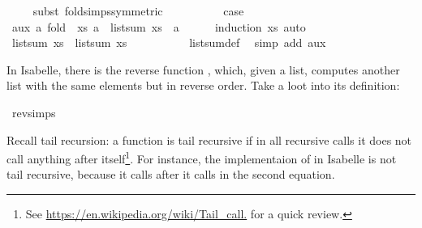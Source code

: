 \begin{isabellebody}
\ \ \ \ \isamarkupfalse%
{\isacharparenleft}{\kern0pt}subst\ fold{\isachardot}{\kern0pt}simps{\isacharparenleft}{\kern0pt}{}{\isacharparenright}{\kern0pt}{\isacharbrackleft}{\kern0pt}symmetric{\isacharbrackright}{\kern0pt}{\isacharparenright}{\kern0pt}\isanewline
\ \ \ \ \isacommand{{\isachardot}{\kern0pt}{\isachardot}{\kern0pt}}\isamarkupfalse%
\isanewline
\isanewline
\ \ \isamarkupfalse%
\ \isamarkupfalse%
\ {\isacharquery}{\kern0pt}case\isanewline
\ \ \ \ \isacommand{{\isachardot}{\kern0pt}}\isamarkupfalse%
\isanewline
{}\isamarkupfalse%
%
\endisatagproof
{\isafoldproof}%
%
\isadelimproof
\isanewline
%
\endisadelimproof
\isanewline
{}\isamarkupfalse%
\ aux{\isacharcolon}{\kern0pt}\ {\isachardoublequoteopen}{\isasymAnd}a{\isachardot}{\kern0pt}\ fold\ {\isacharparenleft}{\kern0pt}{\isacharplus}{\kern0pt}{\isacharparenright}{\kern0pt}\ xs\ a\ {\isacharequal}{\kern0pt}\ list{\isacharunderscore}{\kern0pt}sum\ xs\ {\isacharplus}{\kern0pt}\ a{\isachardoublequoteclose}\ \ \isanewline
%
\isadelimproof
\ \ %
\endisadelimproof
%
\isatagproof
{}\isamarkupfalse%
\ {\isacharparenleft}{\kern0pt}induction\ xs{\isacharparenright}{\kern0pt}\ auto%
\endisatagproof
{\isafoldproof}%
%
\isadelimproof
\isanewline
%
\endisadelimproof
\ \ \ \ \isanewline
\isanewline
{}\isamarkupfalse%
\ {\isachardoublequoteopen}list{\isacharunderscore}{\kern0pt}sum\ xs\ {\isacharequal}{\kern0pt}\ list{\isacharunderscore}{\kern0pt}sum{\isacharprime}{\kern0pt}\ xs{\isachardoublequoteclose}\isanewline
%
\isadelimproof
\ \ \ \ \ \ \isanewline
\ \ %
\endisadelimproof
%
\isatagproof
{}\isamarkupfalse%
\ list{\isacharunderscore}{\kern0pt}sum{\isacharprime}{\kern0pt}{\isacharunderscore}{\kern0pt}def\ \isamarkupfalse%
\ {\isacharparenleft}{\kern0pt}simp\ add{\isacharcolon}{\kern0pt}\ aux{\isacharparenright}{\kern0pt}%
\endisatagproof
{\isafoldproof}%
%
\isadelimproof
%
\endisadelimproof
%
\begin{isamarkuptext}%
In Isabelle, there is the reverse function , which, given a list, computes another list
with the same elements but in reverse order.
Take a loot into its definition:%
\end{isamarkuptext}\isamarkuptrue%
\isamarkupfalse%
\ rev{\isachardot}{\kern0pt}simps%
\begin{isamarkuptext}%
Recall tail recursion: a function is tail recursive if in all recursive calls it does not call 
  anything after itself\footnote{See \url{https://en.wikipedia.org/wiki/Tail_call.} for a quick review.}.
  For instance, the implementaion of  in Isabelle is not tail recursive, because it calls
  \isa{{\isacharparenleft}{\kern0pt}{\isacharat}{\kern0pt}{\isacharparenright}{\kern0pt}} after it calls  in the second equation.
  

\end{isamarkuptext}
\end{isabellebody}

